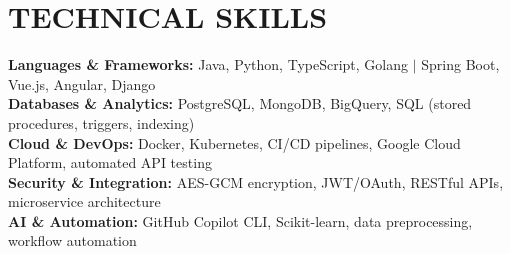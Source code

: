 \documentclass[10pt,a4paper]{article}
\begin{document}
\vspace{-4pt}

\section*{TECHNICAL SKILLS}

\textbf{Languages \& Frameworks:} Java, Python, TypeScript, Golang $|$ Spring Boot, Vue.js, Angular, Django \\
\textbf{Databases \& Analytics:} PostgreSQL, MongoDB, BigQuery, SQL (stored procedures, triggers, indexing) \\
\textbf{Cloud \& DevOps:} Docker, Kubernetes, CI/CD pipelines, Google Cloud Platform, automated API testing \\
\textbf{Security \& Integration:} AES-GCM encryption, JWT/OAuth, RESTful APIs, microservice architecture \\
\textbf{AI \& Automation:} GitHub Copilot CLI, Scikit-learn, data preprocessing, workflow automation
\end{document}
